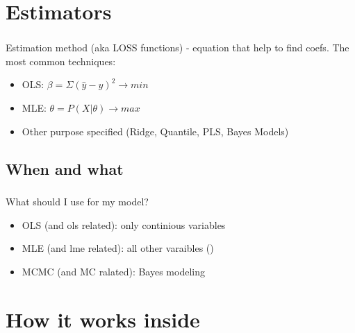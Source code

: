 \documentclass[t, 11pt]{beamer}
\begin{document}
\section{Estimators}

\begin{frame}
	\frametitle{\insertsection} 
	\framesubtitle{\insertsubsection} 
	Estimation method (aka LOSS functions) - equation that help to find coefs. The most common techniques:
	\begin{itemize}
		\item OLS: $\beta = \Sigma(\hat{y} - y)^2 \rightarrow min$
		\item MLE: $\theta = P(X|\theta) \rightarrow max$
		\item Other purpose specified (Ridge, Quantile, PLS, Bayes Models)
		\end{itemize}
	
\end{frame}	



\subsection{When and what}

\begin{frame}
	\frametitle{\insertsection} 
	\framesubtitle{\insertsubsection} 
	What should I use for my model?
	\begin{itemize}
		\item OLS (and ols related): only continious variables
		\item MLE (and lme related): all other varaibles ()
		\item MCMC (and MC ralated): Bayes modeling 
	\end{itemize}
	
\end{frame}	

\section{How it works inside}
	
\begin{frame}
	\frametitle{\insertsection} 
	\framesubtitle{\insertsubsection} 
	
	
\end{frame}	
\end{document}
